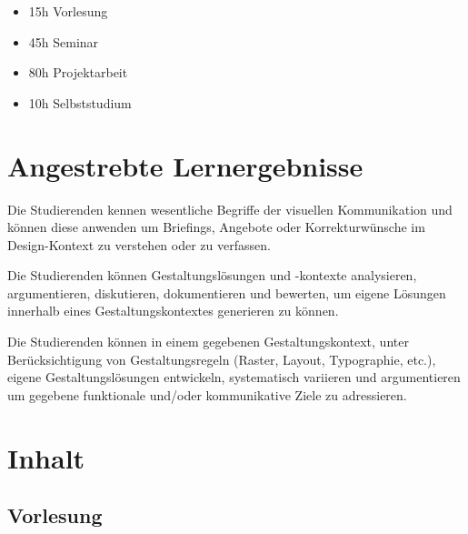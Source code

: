 \begin{itemize}
\tightlist
\item
  15h Vorlesung
\item
  45h Seminar
\item
  80h Projektarbeit
\item
  10h Selbststudium
\end{itemize}

\hypertarget{angestrebte-lernergebnissepathlabelmi-2017modulbeschreibungen-bachelorba_screendesign}{%
\section*{Angestrebte
Lernergebnisse\label{/mi-2017/modulbeschreibungen-bachelor/BA_Screendesign}}\label{angestrebte-lernergebnissepathlabelmi-2017modulbeschreibungen-bachelorba_screendesign}}

Die Studierenden kennen wesentliche Begriffe der visuellen Kommunikation
und können diese anwenden um Briefings, Angebote oder Korrekturwünsche
im Design-Kontext zu verstehen oder zu verfassen.

Die Studierenden können Gestaltungslösungen und -kontexte analysieren,
argumentieren, diskutieren, dokumentieren und bewerten, um eigene
Lösungen innerhalb eines Gestaltungskontextes generieren zu können.

Die Studierenden können in einem gegebenen Gestaltungskontext, unter
Berücksichtigung von Gestaltungsregeln (Raster, Layout, Typographie,
etc.), eigene Gestaltungslösungen entwickeln, systematisch variieren und
argumentieren um gegebene funktionale und/oder kommunikative Ziele zu
adressieren.

\hypertarget{inhaltpathlabelmi-2017modulbeschreibungen-bachelorba_screendesign}{%
\section*{Inhalt\label{/mi-2017/modulbeschreibungen-bachelor/BA_Screendesign}}\label{inhaltpathlabelmi-2017modulbeschreibungen-bachelorba_screendesign}}

\hypertarget{vorlesungpathlabelmi-2017modulbeschreibungen-bachelorba_screendesign}{%
\subsection*{Vorlesung\label{/mi-2017/modulbeschreibungen-bachelor/BA_Screendesign}}\label{vorlesungpathlabelmi-2017modulbeschreibungen-bachelorba_screendesign}}

